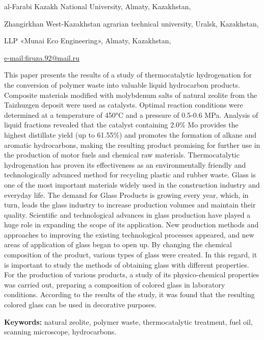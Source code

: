 \begin{affil}
al-Farabi Kazakh National University, Almaty, Kazakhstan,

Zhangirkhan West-Kazakhstan agrarian technical university, Uralsk, Kazakhstan,

LLP «Munai Eco Engineering», Almaty, Kazakhstan,

\href{mailto:e-mailfiruza.92@mail.ru}{e-mail:firuza.92@mail.ru}
\end{affil}

This paper presents the results of a study of thermocatalytic
hydrogenation for the conversion of polymer waste into valuable liquid
hydrocarbon products. Composite materials modified with molybdenum salts
of natural zeolite from the Taizhuzgen deposit were used as catalysts.
Optimal reaction conditions were determined at a temperature of 450°C
and a pressure of 0.5-0.6 MPa. Analysis of liquid fractions revealed
that the catalyst containing 2.0\% Mo provides the highest distillate
yield (up to 61.55\%) and promotes the formation of alkane and aromatic
hydrocarbons, making the resulting product promising for further use in
the production of motor fuels and chemical raw materials.
Thermocatalytic hydrogenation has proven its effectiveness as an
environmentally friendly and technologically advanced method for
recycling plastic and rubber waste. Glass is one of the most important
materials widely used in the construction industry and everyday life.
The demand for Glass Products is growing every year, which, in turn,
leads the glass industry to increase production volumes and maintain
their quality. Scientific and technological advances in glass production
have played a huge role in expanding the scope of its application. New
production methods and approaches to improving the existing
technological processes appeared, and new areas of application of glass
began to open up. By changing the chemical composition of the product,
various types of glass were created. In this regard, it is important to
study the methods of obtaining glass with different properties. For the
production of various products, a study of its physico-chemical
properties was carried out, preparing a composition of colored glass in
laboratory conditions. According to the results of the study, it was
found that the resulting colored glass can be used in decorative
purposes.

{\bfseries Keywords:} natural zeolite, polymer waste, thermocatalytic
treatment, fuel oil, scanning microscope, hydrocarbons.

